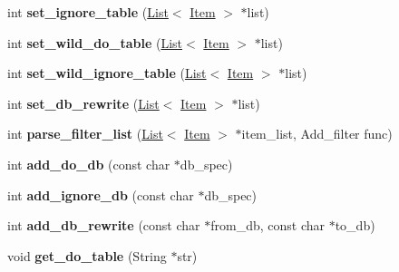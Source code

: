 \begin{DoxyCompactItemize}
\item 
\mbox{\label{classRpl__filter_a4a448c4ae2122fffe19a3c67b35917b0}} 
int {\bfseries set\+\_\+ignore\+\_\+table} (\mbox{\hyperlink{classList}{List}}$<$ \mbox{\hyperlink{classItem}{Item}} $>$ $\ast$list)
\item 
\mbox{\label{classRpl__filter_ae1a184ef40f631ab80a7e920ed9877e6}} 
int {\bfseries set\+\_\+wild\+\_\+do\+\_\+table} (\mbox{\hyperlink{classList}{List}}$<$ \mbox{\hyperlink{classItem}{Item}} $>$ $\ast$list)
\item 
\mbox{\label{classRpl__filter_a3cc94095f62dd320909177a3f2e84e59}} 
int {\bfseries set\+\_\+wild\+\_\+ignore\+\_\+table} (\mbox{\hyperlink{classList}{List}}$<$ \mbox{\hyperlink{classItem}{Item}} $>$ $\ast$list)
\item 
\mbox{\label{classRpl__filter_a6921ff12352f7b9ea1622ae1d4e6ceba}} 
int {\bfseries set\+\_\+db\+\_\+rewrite} (\mbox{\hyperlink{classList}{List}}$<$ \mbox{\hyperlink{classItem}{Item}} $>$ $\ast$list)
\item 
\mbox{\label{classRpl__filter_a477b8f174cf347391d122ef6ddee91b3}} 
int {\bfseries parse\+\_\+filter\+\_\+list} (\mbox{\hyperlink{classList}{List}}$<$ \mbox{\hyperlink{classItem}{Item}} $>$ $\ast$item\+\_\+list, Add\+\_\+filter func)
\item 
\mbox{\label{classRpl__filter_a62bcf6b367964465d322fedb69317a7a}} 
int {\bfseries add\+\_\+do\+\_\+db} (const char $\ast$db\+\_\+spec)
\item 
\mbox{\label{classRpl__filter_af53ebc9eadcc5ad502165bdc9a1985e3}} 
int {\bfseries add\+\_\+ignore\+\_\+db} (const char $\ast$db\+\_\+spec)
\item 
\mbox{\label{classRpl__filter_a967d8ed1c02277e3dee15ef1c7249495}} 
int {\bfseries add\+\_\+db\+\_\+rewrite} (const char $\ast$from\+\_\+db, const char $\ast$to\+\_\+db)
\item 
\mbox{\label{classRpl__filter_a699b9b052547c0db7483f15e254b422c}} 
void {\bfseries get\+\_\+do\+\_\+table} (String $\ast$str)

\end{DoxyCompactItemize}
